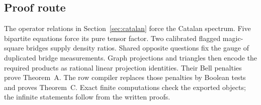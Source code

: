\subsection{Proof route}
The operator relations in Section~\ref{sec:catalan} force the Catalan spectrum. Five bipartite equations force its pure tensor factor. Two calibrated flagged magic-square bridges supply density ratios. Shared opposite questions fix the gauge of duplicated bridge measurements. Graph projections and triangles then encode the required products as rational linear projection identities. Their Bell penalties prove Theorem~A. The row compiler replaces those penalties by Boolean tests and proves Theorem~C. Exact finite computations check the exported objects; the infinite statements follow from the written proofs.
